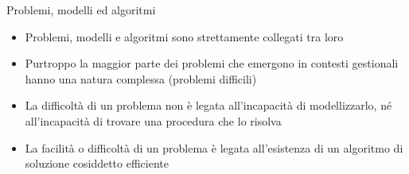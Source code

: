 \documentclass{beamer}
\begin{document}
\begin{frame}{Problemi, modelli ed algoritmi}
\begin{itemize}
\item 
  Problemi, modelli e algoritmi sono strettamente collegati tra loro
\item 
 Purtroppo la maggior parte dei problemi che emergono in contesti gestionali hanno una natura complessa (problemi difficili)
\item 
 La difficolt\`a di un problema non \`e legata all’incapacit\`a di modellizzarlo, né all’incapacit\`a di trovare una procedura che lo risolva
\item 
 La facilit\`a o difficolt\`a di un problema \`e legata all’esistenza di un algoritmo di soluzione cosiddetto efficiente
\end{itemize}
\end{frame}
\end{document}
